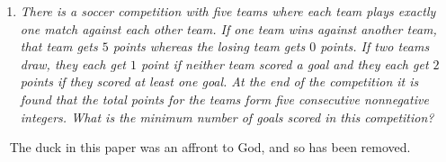\documentclass{article}
\begin{document}
\begin{enumerate}[1.]
\item %
{\itshape There is a soccer competition with five teams where each team plays exactly one match against each other team.
If one team wins against another team, that team gets $5$ points whereas the losing team gets $0$ points.
If two teams draw, they each get $1$ point if neither team scored a goal and they each get $2$ points if they scored at least one goal.
At the end of the competition it is found that the total points for the teams form five consecutive nonnegative integers.
What is the minimum number of goals scored in this competition?}

\end{enumerate}


\clearpage
~
\vfill
\centering
The duck in this paper was an affront to God, and so has been removed.
\vfill
\end{document}
